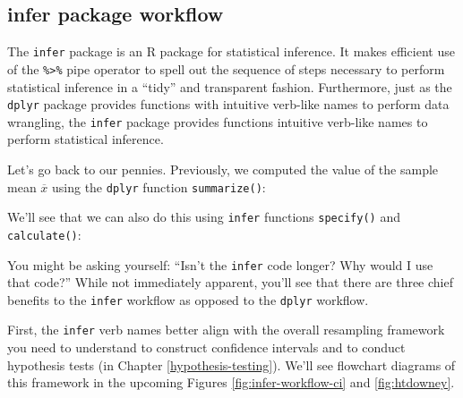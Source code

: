 \documentclass[
]{book}
\newenvironment{Shaded}{\begin{snugshade}}{\end{snugshade}}
\newcommand{\DataTypeTok}[1]{\textcolor[rgb]{0.13,0.29,0.53}{#1}}
\newcommand{\KeywordTok}[1]{\textcolor[rgb]{0.13,0.29,0.53}{\textbf{#1}}}
\newcommand{\NormalTok}[1]{#1}
\newcommand{\OperatorTok}[1]{\textcolor[rgb]{0.81,0.36,0.00}{\textbf{#1}}}
\newcommand{\StringTok}[1]{\textcolor[rgb]{0.31,0.60,0.02}{#1}}
\begin{document}
\hypertarget{infer-workflow}{%
\subsection{infer package workflow}\label{infer-workflow}}

The \texttt{infer} package is an R package for statistical inference. It makes efficient use of the \texttt{\%\textgreater{}\%} pipe operator to spell out the sequence of steps necessary to perform statistical inference in a ``tidy'' and transparent fashion. Furthermore, just as the \texttt{dplyr} package provides functions with intuitive verb-like names to perform data wrangling, the \texttt{infer} package provides functions intuitive verb-like names to perform statistical inference.

Let's go back to our pennies. Previously, we computed the value of the sample mean \(\overline{x}\) using the \texttt{dplyr} function \texttt{summarize()}:

\begin{Shaded}
\end{Shaded}

We'll see that we can also do this using \texttt{infer} functions \texttt{specify()} and \texttt{calculate()}: 

\begin{Shaded}
\end{Shaded}

You might be asking yourself: ``Isn't the \texttt{infer} code longer? Why would I use that code?'' While not immediately apparent, you'll see that there are three chief benefits to the \texttt{infer} workflow as opposed to the \texttt{dplyr} workflow.

First, the \texttt{infer} verb names better align with the overall resampling framework you need to understand to construct confidence intervals and to conduct hypothesis tests (in Chapter \ref{hypothesis-testing}). We'll see flowchart diagrams of this framework in the upcoming Figures \ref{fig:infer-workflow-ci} and \ref{fig:htdowney}.
\end{document}
